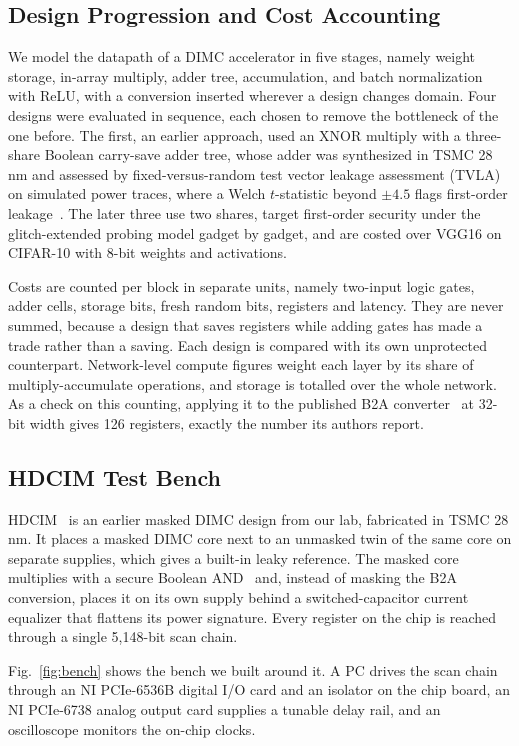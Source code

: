 \documentclass[conference]{IEEEtran}
\begin{document}
\subsection{Design Progression and Cost Accounting}
We model the datapath of a DIMC accelerator in five stages, namely weight storage, in-array multiply, adder
tree, accumulation, and batch normalization with ReLU, with a conversion inserted wherever a design changes
domain. Four designs were evaluated in sequence, each chosen to remove the bottleneck of the one before. The
first, an earlier approach, used an XNOR multiply with a three-share Boolean carry-save adder tree, whose
adder was synthesized in TSMC 28\,nm and assessed by fixed-versus-random test vector leakage assessment (TVLA)
on simulated power traces, where a Welch $t$-statistic beyond $\pm 4.5$ flags first-order
leakage~\cite{schneider2015tvla}. The later three use two shares, target first-order security under the glitch-extended probing model
gadget by gadget, and are costed over VGG16 on CIFAR-10 with 8-bit weights and activations.

Costs are counted per block in separate units, namely two-input logic gates, adder cells, storage bits, fresh
random bits, registers and latency. They are never summed, because a design that saves registers while adding gates has
made a trade rather than a saving. Each design is compared with its own unprotected counterpart. Network-level
compute figures weight each layer by its share of multiply-accumulate operations, and storage is totalled over the
whole network. As a check on this counting, applying it to the published B2A converter~\cite{shahmirzadi2024b2a}
at 32-bit width gives 126 registers, exactly the number its authors report.

\subsection{HDCIM Test Bench}
HDCIM~\cite{pakala2024thesis} is an earlier masked DIMC design from our lab, fabricated in TSMC 28\,nm. It places a masked DIMC
core next to an unmasked twin of the same core on separate supplies, which gives a built-in leaky reference. The
masked core multiplies with a secure Boolean AND~\cite{kumar2023glitchy} and, instead of masking the B2A
conversion, places it on its own supply behind a switched-capacitor current equalizer that flattens its power
signature. Every register on the chip is reached through a single 5,148-bit scan chain.

Fig.~\ref{fig:bench} shows the bench we built around it. A PC drives the scan chain through an NI PCIe-6536B
digital I/O card and an isolator on the chip board, an NI PCIe-6738 analog output card supplies a tunable delay
rail, and an oscilloscope monitors the on-chip clocks.
\end{document}
